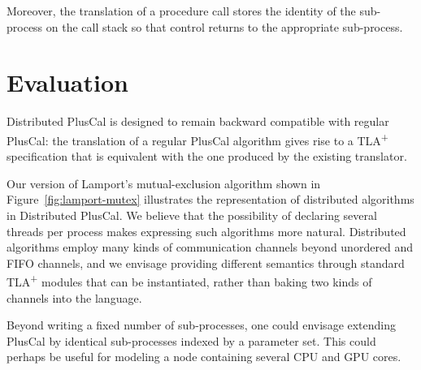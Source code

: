 \documentclass{article}
\newcommand{\tlaplus}{TLA\textsuperscript{+}\xspace}
\begin{document}
Moreover, the translation of a procedure call stores the identity of the sub-process on the call stack so that control returns to the appropriate sub-process.


\section{Evaluation}

Distributed PlusCal is designed to remain backward compatible with regular PlusCal: the translation of a regular PlusCal algorithm gives rise to a \tlaplus specification that is equivalent with the one produced by the existing translator.

Our version of Lamport's mutual-exclusion algorithm shown in Figure~\ref{fig:lamport-mutex} illustrates the representation of distributed algorithms in Distributed PlusCal. We believe that the possibility of declaring several threads per process makes expressing such algorithms more natural. Distributed algorithms employ many kinds of communication channels beyond unordered and FIFO channels, and we envisage providing different semantics through standard \tlaplus modules that can be instantiated, rather than baking two kinds of channels into the language.

Beyond writing a fixed number of sub-processes, one could envisage extending PlusCal by identical sub-processes indexed by a parameter set. This could perhaps be useful for modeling a node containing several CPU and GPU cores.



\end{document}
